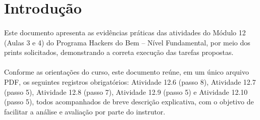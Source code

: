 \section{Introdução}

\paragraph{}
Este documento apresenta as evidências práticas das atividades do Módulo 12
(Aulas 3 e 4) do Programa Hackers do Bem -- Nível Fundamental, por meio dos
prints solicitados, demonstrando a correta execução das tarefas propostas.

\paragraph{}
Conforme as orientações do curso, este documento reúne, em um único arquivo
PDF, os seguintes registros obrigatórios: Atividade 12.6 (passo 8), Atividade
12.7 (passo 5), Atividade 12.8 (passo 7), Atividade 12.9 (passo 5) e Atividade
12.10 (passo 5), todos acompanhados de breve descrição explicativa, com o
objetivo de facilitar a análise e avaliação por parte do instrutor.

